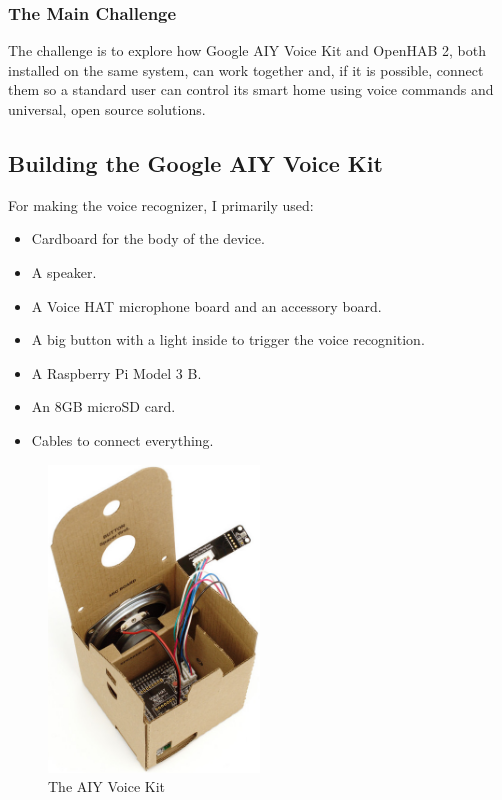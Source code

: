 \subsubsection{The Main Challenge}
The challenge is to explore how Google AIY Voice Kit and OpenHAB 2, both installed on the same system, can work together and, 
if it is possible, connect them so a standard user can control its smart home using voice commands and universal, open source solutions.

\subsection{Building the Google AIY Voice Kit}
For making the voice recognizer, I primarily used:

\begin{itemize}
    \item Cardboard for the body of the device.
    \item A speaker.
    \item A Voice HAT microphone board and an accessory board.
    \item A big button with a light inside to trigger the voice recognition.
    \item A Raspberry Pi Model 3 B.
    \item An 8GB microSD card.
    \item Cables to connect everything.
\end{itemize}

\begin{figure}
    \centering
    \includegraphics[width=0.5\textwidth]{images/Chapter_06/aiy-voice-kit.jpeg}
    \caption{The AIY Voice Kit}
    \label{fig:aiy-voice-kit}
\end{figure}

